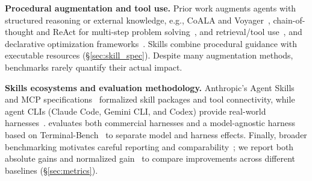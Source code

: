 \textbf{Procedural augmentation and tool use.}
Prior work augments agents with structured reasoning or external knowledge, e.g., CoALA and Voyager~\citep{sumers2024cognitive,wang2023voyager}, chain-of-thought and ReAct for multi-step problem solving~\citep{wei2022chainofthought,yao2023tree,yao2023reactsynergizingreasoningacting,shinn2023reflexion,madaan2023selfrefine,zhou2023leasttomost,zhou2024lats}, and retrieval/tool use~\citep{lewis2021retrievalaugmentedgenerationknowledgeintensivenlp,zhou2023docprompting,schick2023toolformerlanguagemodelsteach,qin2024toolllm}, and declarative optimization frameworks~\citep{khattab2023dspycompilingdeclarativelanguage}.
Skills combine procedural guidance with executable resources (\S\ref{sec:skill_spec}). Despite many augmentation methods, benchmarks rarely quantify their actual impact.



\textbf{Skills ecosystems and evaluation methodology.}
Anthropic's Agent Skills and MCP specifications~\citep{anthropic2025agentskills,anthropic2024mcp} formalized skill packages and tool connectivity, while agent CLIs (Claude Code, Gemini CLI, and Codex) provide real-world harnesses~\citep{anthropic2025claudecode,google2025geminicli,openai2025codexcli}. \benchmarkName{} evaluates both commercial harnesses and a model-agnostic harness based on Terminal-Bench~\citep{merrill2026terminalbenchbenchmarkingagentshard} to separate model and harness effects.
Finally, broader benchmarking motivates careful reporting and comparability~\citep{mattson2020mlperftrainingbenchmark,chiang2024chatbotarenaopenplatform,srivastava2023bigbench}; we report both absolute gains and normalized gain~\citep{hake1998interactive} to compare improvements across different baselines (\S\ref{sec:metrics}).


